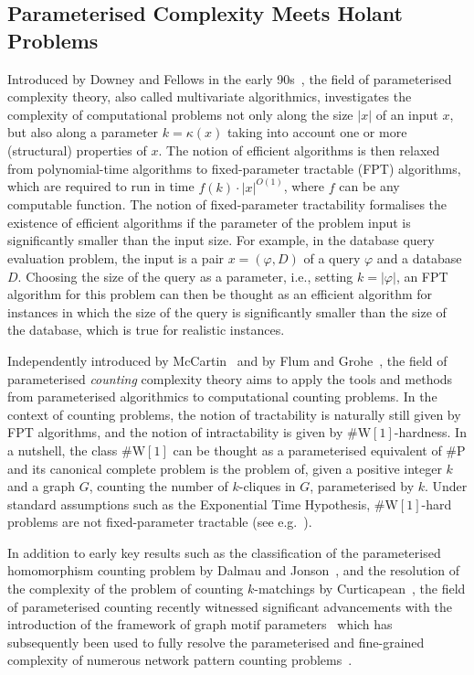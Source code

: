 \documentclass[authorcolumns,numberwithinsect]{no-lipics-v2022}
\newcommand{\W}{\mathrm{W}}
\begin{document}
\subsection{Parameterised Complexity Meets Holant Problems}
Introduced by Downey and Fellows in the early 90s~\cite{DowneyF92}, the field of parameterised complexity theory, also called multivariate algorithmics, investigates the complexity of computational problems not only along the size $|x|$ of an input $x$, but also along a parameter $k=\kappa(x)$ taking into account one or more (structural) properties of $x$. The notion of efficient algorithms is then relaxed from polynomial-time algorithms to fixed-parameter tractable (FPT) algorithms, which are required to run in time $f(k)\cdot |x|^{O(1)}$, where $f$ can be any computable function. The notion of fixed-parameter tractability formalises the existence of efficient algorithms if the parameter of the problem input is significantly smaller than the input size. For example, in the database query evaluation problem, the input is a pair $x=(\varphi,D)$ of a query $\varphi$ and a database $D$. Choosing the size of the query as a parameter, i.e., setting $k=|\varphi|$, an FPT algorithm for this problem can then be thought as an efficient algorithm for instances in which the size of the query is significantly smaller than the size of the database, which is true for realistic instances. 

Independently introduced by McCartin~\cite{McCartin06} and by Flum and Grohe~\cite{FlumG04}, the field of parameterised \emph{counting} complexity theory aims to apply the tools and methods from parameterised algorithmics to computational counting problems. In the context of counting problems, the notion of tractability is naturally
still given by FPT algorithms, and the notion of intractability is given by $\#\W[1]$-hardness. In a nutshell, the class $\#\W[1]$ can be thought as a parameterised equivalent of $\#\mathrm{P}$ and its canonical complete problem is the problem of, given a positive integer $k$ and a graph $G$, counting the number of $k$-cliques in $G$, parameterised by $k$. Under standard assumptions such as the Exponential Time Hypothesis, $\#\W[1]$-hard problems are not fixed-parameter tractable (see e.g.\ \cite{Chenetal05,Chenetal06,CyganFKLMPPS15}).

In addition to early key results such as the classification of the parameterised homomorphism counting problem by Dalmau and Jonson~\cite{DalmauJ04}, and the resolution of the complexity of the problem of counting $k$-matchings by Curticapean~\cite{Curticapean13}, the field of parameterised counting recently witnessed significant advancements with the introduction of the framework of graph motif parameters~\cite{CurticapeanDM17} which has subsequently been used to fully resolve the parameterised and fine-grained complexity of numerous network pattern counting problems~\cite{Roth17,DellRW19,RothSW20,BressanR21,BeraGLSS22,PenaS22,BLR2023stoc,GishbolinerLSY23,DoringMW24,Curticapean24,CurticapeanN24,DoringMW25}.
\end{document}
